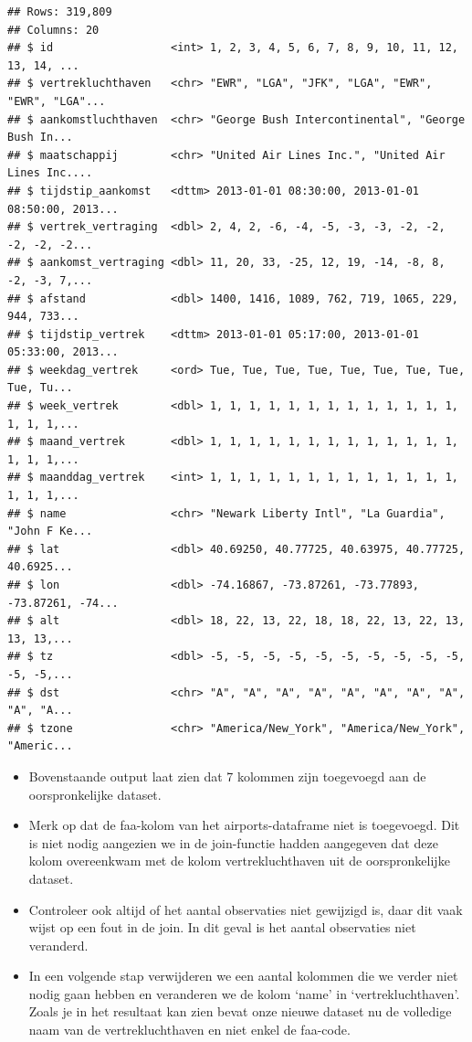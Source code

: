\documentclass[]{tufte-book}
\providecommand{\tightlist}{%
  \setlength{\itemsep}{0pt}\setlength{\parskip}{0pt}}
\begin{document}
\begin{verbatim}
## Rows: 319,809
## Columns: 20
## $ id                  <int> 1, 2, 3, 4, 5, 6, 7, 8, 9, 10, 11, 12, 13, 14, ...
## $ vertrekluchthaven   <chr> "EWR", "LGA", "JFK", "LGA", "EWR", "EWR", "LGA"...
## $ aankomstluchthaven  <chr> "George Bush Intercontinental", "George Bush In...
## $ maatschappij        <chr> "United Air Lines Inc.", "United Air Lines Inc....
## $ tijdstip_aankomst   <dttm> 2013-01-01 08:30:00, 2013-01-01 08:50:00, 2013...
## $ vertrek_vertraging  <dbl> 2, 4, 2, -6, -4, -5, -3, -3, -2, -2, -2, -2, -2...
## $ aankomst_vertraging <dbl> 11, 20, 33, -25, 12, 19, -14, -8, 8, -2, -3, 7,...
## $ afstand             <dbl> 1400, 1416, 1089, 762, 719, 1065, 229, 944, 733...
## $ tijdstip_vertrek    <dttm> 2013-01-01 05:17:00, 2013-01-01 05:33:00, 2013...
## $ weekdag_vertrek     <ord> Tue, Tue, Tue, Tue, Tue, Tue, Tue, Tue, Tue, Tu...
## $ week_vertrek        <dbl> 1, 1, 1, 1, 1, 1, 1, 1, 1, 1, 1, 1, 1, 1, 1, 1,...
## $ maand_vertrek       <dbl> 1, 1, 1, 1, 1, 1, 1, 1, 1, 1, 1, 1, 1, 1, 1, 1,...
## $ maanddag_vertrek    <int> 1, 1, 1, 1, 1, 1, 1, 1, 1, 1, 1, 1, 1, 1, 1, 1,...
## $ name                <chr> "Newark Liberty Intl", "La Guardia", "John F Ke...
## $ lat                 <dbl> 40.69250, 40.77725, 40.63975, 40.77725, 40.6925...
## $ lon                 <dbl> -74.16867, -73.87261, -73.77893, -73.87261, -74...
## $ alt                 <dbl> 18, 22, 13, 22, 18, 18, 22, 13, 22, 13, 13, 13,...
## $ tz                  <dbl> -5, -5, -5, -5, -5, -5, -5, -5, -5, -5, -5, -5,...
## $ dst                 <chr> "A", "A", "A", "A", "A", "A", "A", "A", "A", "A...
## $ tzone               <chr> "America/New_York", "America/New_York", "Americ...
\end{verbatim}

\begin{itemize}
\tightlist
\item
  Bovenstaande output laat zien dat 7 kolommen zijn toegevoegd aan de oorspronkelijke dataset.
\item
  Merk op dat de faa-kolom van het airports-dataframe niet is toegevoegd. Dit is niet nodig aangezien we in de join-functie hadden aangegeven dat deze kolom overeenkwam met de kolom vertrekluchthaven uit de oorspronkelijke dataset.
\item
  Controleer ook altijd of het aantal observaties niet gewijzigd is, daar dit vaak wijst op een fout in de join. In dit geval is het aantal observaties niet veranderd.
\item
  In een volgende stap verwijderen we een aantal kolommen die we verder niet nodig gaan hebben en veranderen we de kolom `name' in `vertrekluchthaven'. Zoals je in het resultaat kan zien bevat onze nieuwe dataset nu de volledige naam van de vertrekluchthaven en niet enkel de faa-code.
\end{itemize}
\end{document}

